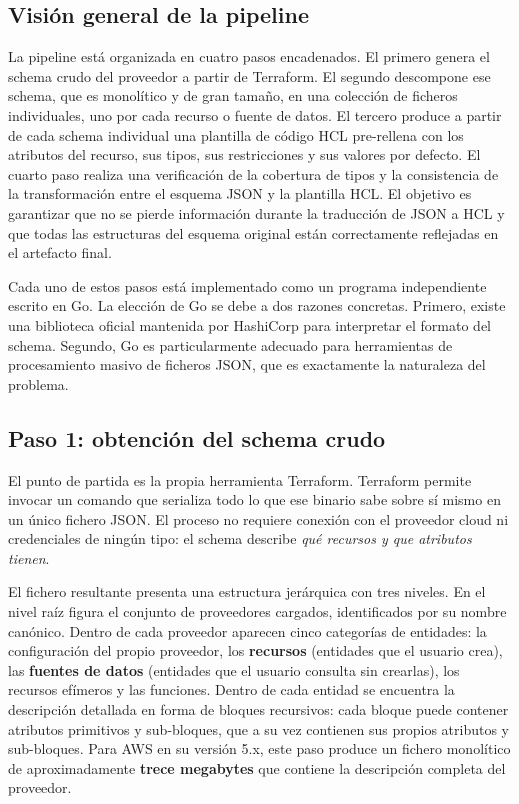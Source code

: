 \documentclass{article}
\begin{document}
{        \subsection{Visión general de la pipeline}
        \justify
        La pipeline está organizada en cuatro pasos encadenados. El primero genera el schema crudo del
        proveedor a partir de Terraform. El segundo descompone ese schema, que es
        monolítico y de gran tamaño, en una colección de ficheros individuales, uno
        por cada recurso o fuente de datos. El tercero produce a partir de cada schema individual una plantilla de código HCL
        pre-rellena con los atributos del recurso,
        sus tipos, sus restricciones y sus valores por defecto. El cuarto paso realiza una verificación de la cobertura de tipos y la consistencia de la transformación entre el esquema JSON y la plantilla HCL.
        El objetivo es garantizar que no se pierde información durante la traducción de JSON a HCL y que todas las estructuras del esquema original están correctamente reflejadas en el artefacto final.

        \justify
        Cada uno de estos pasos está implementado como un programa independiente
        escrito en Go. La elección de Go se debe a dos
        razones concretas. Primero, existe una biblioteca oficial mantenida por
        HashiCorp para interpretar el formato del schema.
        Segundo, Go es particularmente adecuado para herramientas de procesamiento masivo de ficheros JSON, que es exactamente la
        naturaleza del problema.

        \subsection{Paso 1: obtención del schema crudo}
        \justify
        El punto de partida es la propia herramienta Terraform. Terraform permite invocar un comando que
        serializa todo lo que ese binario sabe sobre sí mismo en un único fichero
        JSON. El proceso no requiere conexión con el proveedor cloud ni credenciales
        de ningún tipo: el schema describe \textit{qué recursos y que atributos tienen}.

        \justify
        El fichero resultante presenta una estructura jerárquica con tres niveles. En
        el nivel raíz figura el conjunto de proveedores cargados, identificados por su
        nombre canónico. Dentro de cada proveedor aparecen cinco categorías de
        entidades: la configuración del propio proveedor, los \textbf{recursos}
        (entidades que el usuario crea), las \textbf{fuentes de datos} (entidades que
        el usuario consulta sin crearlas), los recursos efímeros y las funciones.
        Dentro de cada entidad se encuentra la descripción detallada en forma de
        bloques recursivos: cada bloque puede contener atributos primitivos y
        sub-bloques, que a su vez contienen sus propios atributos y sub-bloques.
        \justify
        Para AWS en su versión 5.x, este paso produce un fichero monolítico de
        aproximadamente \textbf{trece megabytes} que contiene la descripción completa
        del proveedor.

}
\end{document}
